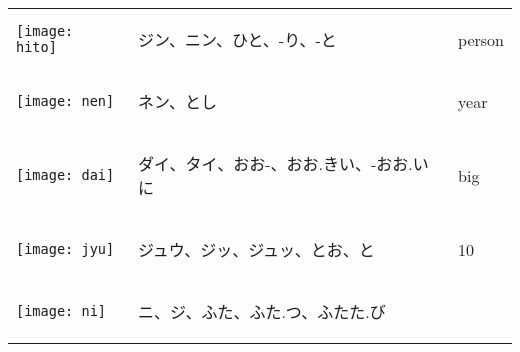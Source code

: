 \documentclass[a4paper,12pt]{extarticle}
\begin{document}
\begin{longtable}{|lp{6cm}p{4cm}|}
\begin{minipage}{0.3\textwidth}
		\centerline{
			\texttt{[image: hito]}
		}
	\end{minipage}
	                                   &
	\begin{CJK}{UTF8}{min}ジン、ニン、ひと、-り、-と\end{CJK}
	                                   &
	person
	\\
	\begin{minipage}{0.3\textwidth}
		\centerline{
			\texttt{[image: nen]}
		}
	\end{minipage}
	                                   &
	\begin{CJK}{UTF8}{min}ネン、とし\end{CJK}
	                                   &
	year
	\\
	\begin{minipage}{0.3\textwidth}
		\centerline{
			\texttt{[image: dai]}
		}
	\end{minipage}
	                                   &
	\begin{CJK}{UTF8}{min}ダイ、タイ、おお-、おお.きい、-おお.いに\end{CJK}
	                                   &
	big
	\\
	\begin{minipage}{0.3\textwidth}
		\centerline{
			\texttt{[image: jyu]}
		}
	\end{minipage}
	                                   &
	\begin{CJK}{UTF8}{min}ジュウ、ジッ、ジュッ、とお、と\end{CJK}
	                                   &
	10
	\\
	\begin{minipage}{0.3\textwidth}
		\centerline{
			\texttt{[image: ni]}
		}
	\end{minipage}
	                                   &
	\begin{CJK}{UTF8}{min}ニ、ジ、ふた、ふた.つ、ふたた.び\end{CJK}

\end{longtable}
\end{document}
